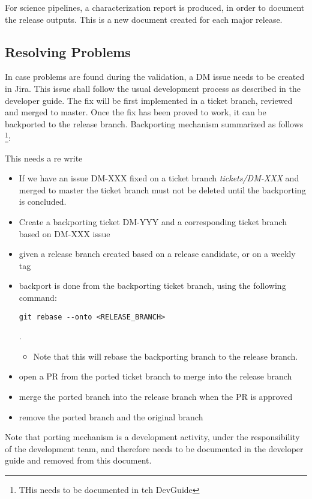 For science pipelines, a characterization report is produced, in order to document the release outputs.
This is a new document created for each major release.


\subsection{Resolving Problems}

In case problems are found during the validation, a DM issue needs to be created in Jira.
This issue shall follow the usual development process as described in the developer guide.
The fix will be first implemented in a ticket branch, reviewed and merged to master.
Once the fix has been proved to work, it can be backported to the release branch.
Backporting mechanism summarized as follows \footnote{THis needs to be documented in teh DevGuide}:


{\color{red} This needs a re write}
\begin{itemize}
\item If we have an issue DM-XXX fixed on a ticket branch \textit{tickets/DM-XXX} and merged to master
the ticket branch must not be deleted  until the backporting is concluded.
\item Create a  backporting ticket DM-YYY  and a corresponding ticket branch based on DM-XXX issue
\item given a release branch created based on a release candidate, or on a weekly tag
\item backport is done from the backporting ticket branch, using the following command: \begin{verbatim}git rebase --onto <RELEASE_BRANCH>\end{verbatim} .
\begin{itemize}
\item Note that this will rebase the backporting branch to the release branch.
\end{itemize}
\item open a PR from the ported ticket branch to merge into the release branch
\item merge the ported branch into the release branch when the PR is approved
\item remove the ported branch and the original branch
\end{itemize}

Note that porting mechanism is a development activity, under the responsibility of the development team, and therefore needs to be documented in the developer guide and removed from this document.

